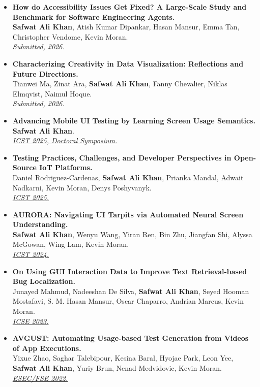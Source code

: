 \documentclass[a4paper,10pt]{article}
\begin{document}
\begin{itemize}[leftmargin=1em, itemsep=6pt]

\item \textbf{How do Accessibility Issues Get Fixed? A Large-Scale Study and Benchmark for Software Engineering Agents.}\\
\textbf{Safwat Ali Khan}, Atish Kumar Dipankar, Hasan Mansur, Emma Tan, Christopher Vendome, Kevin Moran.\\
\textit{Submitted, 2026.}

\item \textbf{Characterizing Creativity in Data Visualization: Reflections and Future Directions.}\\
Tianwei Ma, Zinat Ara, \textbf{Safwat Ali Khan}, Fanny Chevalier, Niklas Elmqvist, Naimul Hoque.\\
\textit{Submitted, 2026.}

\item \textbf{Advancing Mobile UI Testing by Learning Screen Usage Semantics.}\\
\textbf{Safwat Ali Khan}.\\
\href{https://ieeexplore.ieee.org/document/10988951}{\textit{ICST 2025, Doctoral Symposium.}}

\item \textbf{Testing Practices, Challenges, and Developer Perspectives in Open-Source IoT Platforms.}\\
Daniel Rodriguez-Cardenas, \textbf{Safwat Ali Khan}, Prianka Mandal, Adwait Nadkarni, Kevin Moran, Denys Poshyvanyk.\\
\href{https://ieeexplore.ieee.org/document/10988986}{\textit{ICST 2025.}}

\item \textbf{AURORA: Navigating UI Tarpits via Automated Neural Screen Understanding.}\\
\textbf{Safwat Ali Khan}, Wenyu Wang, Yiran Ren, Bin Zhu, Jiangfan Shi, Alyssa McGowan, Wing Lam, Kevin Moran.\\
\href{https://ieeexplore.ieee.org/document/10638617}{\textit{ICST 2024.}}

\item \textbf{On Using GUI Interaction Data to Improve Text Retrieval-based Bug Localization.}\\
Junayed Mahmud, Nadeeshan De Silva, \textbf{Safwat Ali Khan}, Seyed Hooman Mostafavi, S. M. Hasan Mansur, Oscar Chaparro, Andrian Marcus, Kevin Moran.\\
\href{https://dl.acm.org/doi/10.1145/3597503.3608139}{\textit{ICSE 2023.}}

\item \textbf{AVGUST: Automating Usage-based Test Generation from Videos of App Executions.}\\
Yixue Zhao, Saghar Talebipour, Kesina Baral, Hyojae Park, Leon Yee, \textbf{Safwat Ali Khan}, Yuriy Brun, Nenad Medvidovic, Kevin Moran.\\
\href{https://dl.acm.org/doi/10.1145/3540250.3549134}{\textit{ESEC/FSE 2022.}}

\end{itemize}
\end{document}
